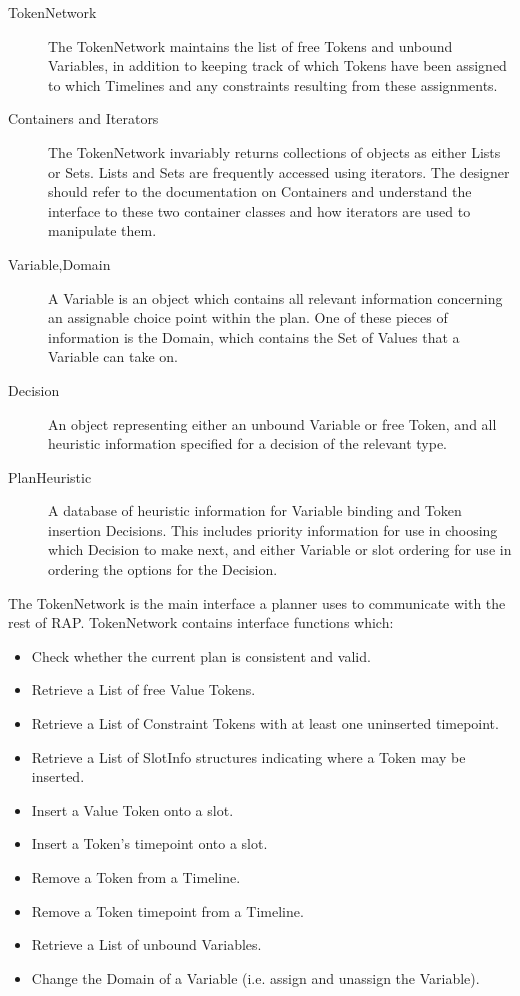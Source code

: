 \begin{description}
    \item[TokenNetwork] The TokenNetwork maintains the list of free Tokens and 
    unbound Variables, in addition to keeping track of which Tokens have been
    assigned to which Timelines and any constraints resulting from these
    assignments. 

    \item[Containers and Iterators] The TokenNetwork invariably returns collections
    of objects as either Lists or Sets.  Lists and Sets are frequently accessed using
    iterators.  The designer should refer to the documentation
    on Containers and understand the interface to these two container classes
    and how iterators are used to manipulate them.

    \item[Variable,Domain] A Variable is an object which contains
    all relevant information concerning an assignable choice point
    within the plan.  One of these pieces of information is the
    Domain, which contains the Set of Values that a Variable can
    take on.

    \item[Decision] An object representing either an unbound Variable or free Token,
    and all heuristic information specified for a decision of the relevant type.

    \item[PlanHeuristic] A database of heuristic information for Variable binding
    and Token insertion Decisions.  This includes priority information for use in
    choosing which Decision to make next, and either Variable or slot ordering for
    use in ordering the options for the Decision.    
\end{description}

The TokenNetwork is the main interface a planner uses to communicate with the rest of
RAP.  TokenNetwork contains interface functions which:
\begin{itemize}
    \item Check whether the current plan is consistent and valid.
    \item Retrieve a List of free Value Tokens.
    \item Retrieve a List of Constraint Tokens with at least one uninserted timepoint.
    \item Retrieve a List of SlotInfo structures indicating where a Token may be inserted.
    \item Insert a Value Token onto a slot.
    \item Insert a Token's timepoint onto a slot.
    \item Remove a Token from a Timeline.
    \item Remove a Token timepoint from a Timeline.
    \item Retrieve a List of unbound Variables.
    \item Change the Domain of a Variable (i.e. assign and unassign the Variable).  
\end{itemize}

